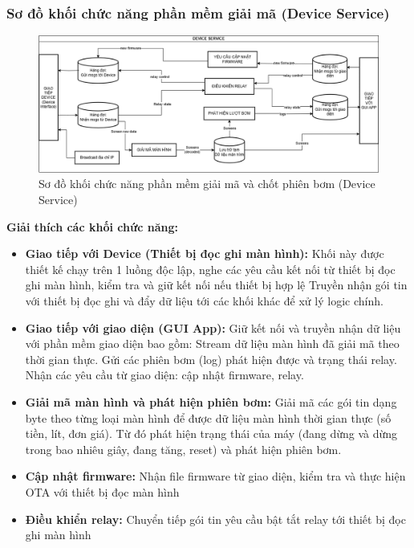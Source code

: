 \subsubsection{Sơ đồ khối chức năng phần mềm giải mã (Device Service)}

\begin{figure}[!ht]
    \centering
    \includegraphics[width=1.0\linewidth]{Figures/Chap3_DeviceService-function-block.png}
    \caption{Sơ đồ khối chức năng phần mềm giải mã và chốt phiên bơm (Device Service)}
    \label{fig:hinh3.3}
\end{figure}

\textbf{Giải thích các khối chức năng:}

\begin{itemize}
    \item \textbf{Giao tiếp với Device (Thiết bị đọc ghi màn hình):} 
    \subitem Khối này được thiết kế chạy trên 1 luồng độc lập, nghe các yêu cầu kết nối từ thiết bị đọc ghi màn hình, kiểm tra và giữ kết nối nếu thiết bị hợp lệ 
    \subitem Truyền nhận gói tin với thiết bị đọc ghi và đẩy dữ liệu tới các khối khác để xử lý logic chính.

    \item \textbf{Giao tiếp với giao diện (GUI App):} Giữ kết nối và truyền nhận dữ liệu với phần mềm giao diện bao gồm:
    \subitem Stream dữ liệu màn hình đã giải mã theo thời gian thực.
    \subitem Gửi các phiên bơm (log) phát hiện được và trạng thái relay.
    \subitem Nhận các yêu cầu từ giao diện: cập nhật firmware, relay.
    \item \textbf{Giải mã màn hình và phát hiện phiên bơm:} Giải mã các gói tin dạng byte theo từng loại màn hình để được dữ liệu màn hình thời gian thực (số tiền, lít, đơn giá). Từ đó phát hiện trạng thái của máy (đang dừng và dừng trong bao nhiêu giây, đang tăng, reset) và phát hiện phiên bơm.
    \item \textbf{Cập nhật firmware:} Nhận file firmware từ giao diện, kiểm tra và thực hiện OTA với thiết bị đọc màn hình 
    \item \textbf{Điều khiển relay:} Chuyển tiếp gói tin yêu cầu bật tắt relay tới thiết bị đọc ghi màn hình
\end{itemize}


